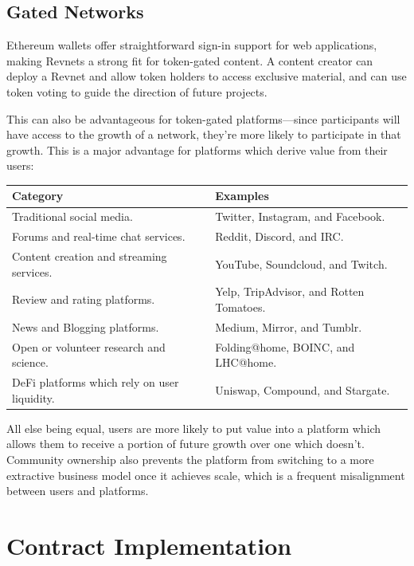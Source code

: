 \documentclass{article}
\begin{document}
\subsection{Gated Networks}

Ethereum wallets offer straightforward sign-in support for web applications, making Revnets a strong fit for token-gated content. A content creator can deploy a Revnet and allow token holders to access exclusive material, and can use token voting to guide the direction of future projects.

This can also be advantageous for token-gated platforms---since participants will have access to the growth of a network, they're more likely to participate in that growth. This is a major advantage for platforms which derive value from their users:

\begin{table}[h]
  \centering
  \begin{tabularx}{\textwidth}{|X|X|}
    \hline \textbf{Category} & \textbf{Examples} \\
    \hline Traditional social media. & Twitter, Instagram, and Facebook. \\
    \hline Forums and real-time chat services. & Reddit, Discord, and IRC. \\
    \hline Content creation and streaming services. & YouTube, Soundcloud, and Twitch. \\
    \hline Review and rating platforms. & Yelp, TripAdvisor, and Rotten Tomatoes. \\
    \hline News and Blogging platforms. & Medium, Mirror, and Tumblr. \\
    \hline Open or volunteer research and science. & Folding@home, BOINC, and LHC@home. \\
    \hline DeFi platforms which rely on user liquidity. & Uniswap, Compound, and Stargate. \\
    \hline
  \end{tabularx}
\end{table}

All else being equal, users are more likely to put value into a platform which allows them to receive a portion of future growth over one which doesn't. Community ownership also prevents the platform from switching to a more extractive business model once it achieves scale, which is a frequent misalignment between users and platforms.

\section{Contract Implementation}
\end{document}
